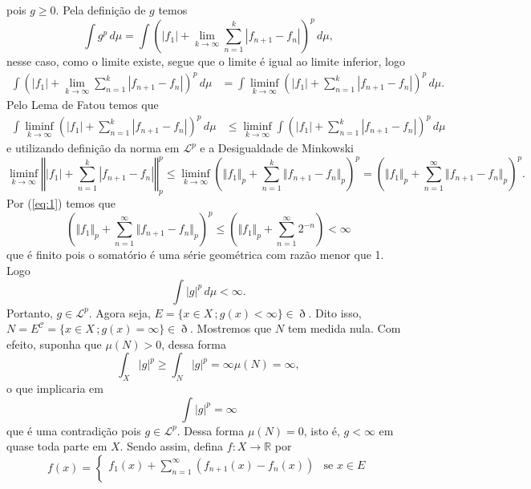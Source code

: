 \documentclass[a4paper, 11pt]{book}
\theoremstyle{definition}
\newcommand{\bR}{\mathbb{R}}
\newcommand{\cC}{\mathcal{C}}
\newcommand{\cL}{\mathcal{L}}
\begin{document}
\begin{prf}
\[    \]
    pois $g \geqslant 0$. Pela definição de $g$ temos
    \[
        \int g^p \,d\mu = \int \left( |f_1| + \lim_{k\to\infty} \sum_{n=1}^{k} |f_{n+1} - f_n| \right)^p \, d\mu,
    \]
    nesse caso, como o limite existe, segue que o limite é igual ao limite inferior, logo
    \[
        \begin{aligned}
            \int \left( |f_1| + \lim_{k\to\infty} \sum_{n=1}^{k} |f_{n+1} - f_n| \right)^p \, d\mu
            &= \int \liminf_{k\to\infty}\left( |f_1| +  \sum_{n=1}^{k} |f_{n+1} - f_n| \right)^p \, d\mu.
        \end{aligned}
    \]
    Pelo Lema de Fatou temos que
    \[
        \begin{aligned}
            \int \liminf_{k\to\infty}\left( |f_1| +  \sum_{n=1}^{k} |f_{n+1} - f_n| \right)^p \, d\mu &\leqslant \liminf_{k\to\infty}\int \left( |f_1| +  \sum_{n=1}^{k} |f_{n+1} - f_n| \right)^p \, d\mu 
        \end{aligned}
    \]
    e utilizando definição da norma em $\cL^p$ e a Desigualdade de Minkowski
    \small{
    \[
        \liminf_{k\to\infty} \left\Vert |f_1| + \sum_{n=1}^k |f_{n+1} - f_n| \right\Vert _p^p  \leqslant \liminf_{k\to\infty} \left( \Vert f_1 \Vert_p + \sum_{n=1}^{k} \Vert f_{n+1} - f_n \Vert_p \right)^p = \left( \Vert f_1 \Vert_p + \sum_{n=1}^{\infty} \Vert f_{n+1} - f_n \Vert_p \right)^p.
    \]}
    Por (\ref{eq:1}) temos que
    \[
        \left( \Vert f_1 \Vert_p + \sum_{n=1}^{\infty} \Vert f_{n+1} - f_n \Vert_p \right)^p \leqslant \left( \Vert f_1 \Vert_p + \sum_{n=1}^{\infty} 2^{-n} \right) < \infty
    \]
    que é finito pois o somatório é uma série geométrica com razão menor que 1.
    Logo
    \[
        \int |g|^p \,d\mu < \infty.
    \]
    Portanto, $g \in \cL^p$.
    Agora seja, $E = \{x \in X \,; g(x) < \infty\} \in \eth$. Dito isso, $N = E^\cC = \{x \in X \,; g(x) = \infty\} \in \eth$. Mostremos que $N$ tem medida nula.
    Com efeito, suponha que $\mu(N) > 0$, dessa forma
    \[
        \int_X |g|^p \geqslant \int_{N} |g|^p  = \infty \mu(N) = \infty,
    \]
    o que implicaria em
    \[
        \int |g|^p = \infty
    \]
    que é uma contradição pois $g \in \cL^p$.
    Dessa forma $\mu(N) = 0$, isto é, $g < \infty$ em quase toda parte em $X$.
    Sendo assim, defina $f : X \to \bR$ por
    \[
        f(x) = 
        \begin{cases}
            f_1(x) + \sum_{n=1}^{\infty} (f_{n+1}(x) - f_n(x)) &\text{se } x \in E\\

\end{cases}\]
\end{prf}
\end{document}
